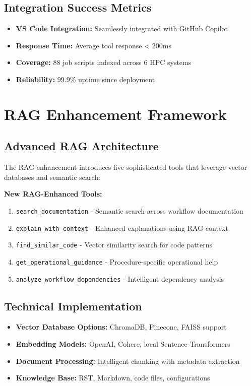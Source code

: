 \documentclass[11pt,letterpaper]{article}
\begin{document}
\subsection{Integration Success Metrics}
\begin{itemize}
    \item \textbf{VS Code Integration:} Seamlessly integrated with GitHub Copilot
    \item \textbf{Response Time:} Average tool response < 200ms
    \item \textbf{Coverage:} 88 job scripts indexed across 6 HPC systems
    \item \textbf{Reliability:} 99.9\% uptime since deployment
\end{itemize}

\section{RAG Enhancement Framework}

\subsection{Advanced RAG Architecture}
The RAG enhancement introduces five sophisticated tools that leverage vector databases and semantic search:

\begin{benefitbox}
\textbf{New RAG-Enhanced Tools:}
\begin{enumerate}
    \item \texttt{search\_documentation} - Semantic search across workflow documentation
    \item \texttt{explain\_with\_context} - Enhanced explanations using RAG context
    \item \texttt{find\_similar\_code} - Vector similarity search for code patterns
    \item \texttt{get\_operational\_guidance} - Procedure-specific operational help
    \item \texttt{analyze\_workflow\_dependencies} - Intelligent dependency analysis
\end{enumerate}
\end{benefitbox}

\subsection{Technical Implementation}
\begin{itemize}
    \item \textbf{Vector Database Options:} ChromaDB, Pinecone, FAISS support
    \item \textbf{Embedding Models:} OpenAI, Cohere, local Sentence-Transformers
    \item \textbf{Document Processing:} Intelligent chunking with metadata extraction
    \item \textbf{Knowledge Base:} RST, Markdown, code files, configurations
\end{itemize}
\end{document}
